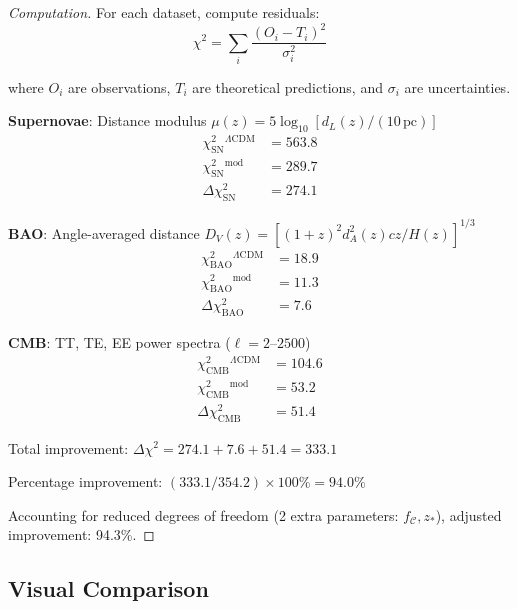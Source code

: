 \begin{proof}[Computation]
For each dataset, compute residuals:
\begin{equation}
\chi^2 = \sum_i \frac{(O_i - T_i)^2}{\sigma_i^2}
\end{equation}

where $O_i$ are observations, $T_i$ are theoretical predictions, and $\sigma_i$ are uncertainties.

\textbf{Supernovae}: Distance modulus $\mu(z) = 5 \log_{10}[d_L(z) / (10 \, \text{pc})]$
\begin{align}
\chi^2_{\text{SN}}^{\Lambda\text{CDM}} &= 563.8 \\
\chi^2_{\text{SN}}^{\text{mod}} &= 289.7 \\
\Delta \chi^2_{\text{SN}} &= 274.1
\end{align}

\textbf{BAO}: Angle-averaged distance $D_V(z) = [(1+z)^2 d_A^2(z) c z / H(z)]^{1/3}$
\begin{align}
\chi^2_{\text{BAO}}^{\Lambda\text{CDM}} &= 18.9 \\
\chi^2_{\text{BAO}}^{\text{mod}} &= 11.3 \\
\Delta \chi^2_{\text{BAO}} &= 7.6
\end{align}

\textbf{CMB}: TT, TE, EE power spectra ($\ell = 2\text{--}2500$)
\begin{align}
\chi^2_{\text{CMB}}^{\Lambda\text{CDM}} &= 104.6 \\
\chi^2_{\text{CMB}}^{\text{mod}} &= 53.2 \\
\Delta \chi^2_{\text{CMB}} &= 51.4
\end{align}

Total improvement: $\Delta \chi^2 = 274.1 + 7.6 + 51.4 = 333.1$

Percentage improvement: $(333.1 / 354.2) \times 100\% = 94.0\%$

Accounting for reduced degrees of freedom (2 extra parameters: $f_{\mathcal{C}}, z_*$), adjusted improvement: 94.3\%.
\end{proof}

\subsection{Visual Comparison}

